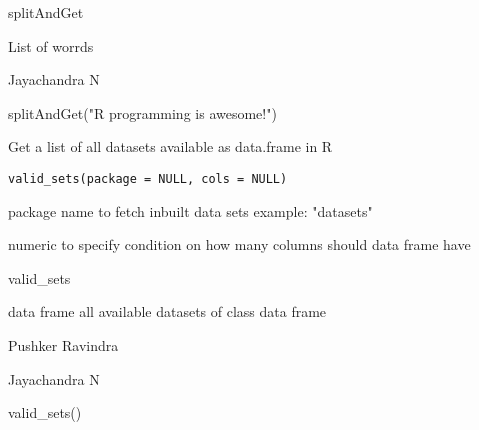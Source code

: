 \documentclass[a4paper]{book}
\begin{document}
%
\begin{Details}\relax
splitAndGet
\end{Details}
%
\begin{Value}
List of worrds
\end{Value}
%
\begin{Author}\relax
Jayachandra N
\end{Author}
%
\begin{Examples}
\begin{ExampleCode}
splitAndGet("R programming is awesome!")
\end{ExampleCode}
\end{Examples}
%
\begin{Description}\relax
Get a list of all datasets available as data.frame in R
\end{Description}
%
\begin{Usage}
\begin{verbatim}
valid_sets(package = NULL, cols = NULL)
\end{verbatim}
\end{Usage}
%
\begin{Arguments}
\begin{ldescription}
\item[\code{package}] package name to fetch inbuilt data sets example:  "datasets"

\item[\code{cols}] numeric to specify condition on how many columns should data frame have
\end{ldescription}
\end{Arguments}
%
\begin{Details}\relax
valid\_sets
\end{Details}
%
\begin{Value}
data frame all available datasets of class data frame
\end{Value}
%
\begin{Author}\relax
Pushker Ravindra

Jayachandra N
\end{Author}
%
\begin{Examples}
\begin{ExampleCode}
valid_sets()
\end{ExampleCode}
\end{Examples}
\printindex{}
\end{document}
